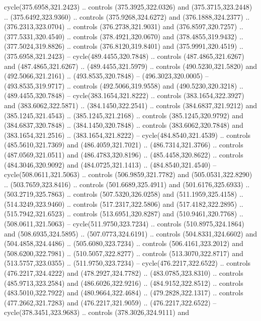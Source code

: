 \begin{scope}[cm={{1.25,0.0,0.0,-1.25,(0.0,743.43331)}}]
    cycle(375.6958,321.2423) .. controls (375.3925,322.0326) and
    (375.3715,323.2448) .. (375.6492,323.9360) .. controls (375.9268,324.6272) and
    (376.1888,324.2377) .. (376.2313,323.0704) .. controls (376.2738,321.9031) and
    (376.8597,320.7257) .. (377.5331,320.4540) .. controls (378.4921,320.0670) and
    (378.4855,319.9432) .. (377.5024,319.8826) .. controls (376.8120,319.8401) and
    (375.9991,320.4519) .. (375.6958,321.2423) -- cycle(489.4455,320.7848) ..
    controls (487.4865,321.6267) and (487.4865,321.6267) .. (489.4455,321.5979) ..
    controls (490.5230,321.5820) and (492.5066,321.2161) .. (493.8535,320.7848) --
    (496.3023,320.0005) -- (493.8535,319.9717) .. controls (492.5066,319.9558) and
    (490.5230,320.3218) .. (489.4455,320.7848) -- cycle(383.1654,321.8222) ..
    controls (383.1654,322.3927) and (383.6062,322.5871) .. (384.1450,322.2541) ..
    controls (384.6837,321.9212) and (385.1245,321.4543) .. (385.1245,321.2168) ..
    controls (385.1245,320.9792) and (384.6837,320.7848) .. (384.1450,320.7848) ..
    controls (383.6062,320.7848) and (383.1654,321.2516) .. (383.1654,321.8222) --
    cycle(484.8540,321.4539) .. controls (485.5610,321.7369) and
    (486.4059,321.7021) .. (486.7314,321.3766) .. controls (487.0569,321.0511) and
    (486.4783,320.8196) .. (485.4458,320.8622) .. controls (484.3046,320.9092) and
    (484.0725,321.1413) .. (484.8540,321.4540) -- cycle(508.0611,321.5063) ..
    controls (506.9859,321.7782) and (505.0531,322.8290) .. (503.7659,323.8416) ..
    controls (501.6689,325.4911) and (501.6176,325.6933) .. (503.2719,325.7863) ..
    controls (507.5320,326.0258) and (511.1959,325.4158) .. (514.3249,323.9460) ..
    controls (517.2317,322.5806) and (517.4182,322.2895) .. (515.7942,321.6523) ..
    controls (513.6951,320.8287) and (510.9461,320.7768) .. (508.0611,321.5063) --
    cycle(511.9750,323.7234) .. controls (510.8975,324.1864) and
    (508.6935,324.5895) .. (507.0773,324.6191) .. controls (504.8331,324.6602) and
    (504.4858,324.4486) .. (505.6080,323.7234) .. controls (506.4161,323.2012) and
    (508.6200,322.7981) .. (510.5057,322.8277) .. controls (513.3070,322.8717) and
    (513.5757,323.0355) .. (511.9750,323.7234) -- cycle(476.2217,322.6522) ..
    controls (476.2217,324.4222) and (478.2927,324.7782) .. (483.0785,323.8310) ..
    controls (485.9713,323.2584) and (486.6026,322.9216) .. (484.9152,322.8512) ..
    controls (483.5010,322.7922) and (480.9664,322.4684) .. (479.2828,322.1317) ..
    controls (477.2662,321.7283) and (476.2217,321.9059) .. (476.2217,322.6522) --
    cycle(378.3451,323.9683) .. controls (378.3026,324.9111) and

\end{scope}
